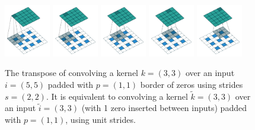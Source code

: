 \begin{figure}
	\includegraphics[width=0.18\textwidth]{figures/padding_strides_transposed_00}
	\includegraphics[width=0.18\textwidth]{figures/padding_strides_transposed_01}
	\includegraphics[width=0.18\textwidth]{figures/padding_strides_transposed_02}
	\includegraphics[width=0.18\textwidth]{figures/padding_strides_transposed_03}
	\includegraphics[width=0.18\textwidth]{figures/padding_strides_transposed_04}
	\caption{ The transpose of convolving a kernel $k=(3,3)$ over an input $i=(5,5)$ padded with $p=(1,1)$ border of zeros using strides $s=(2,2)$. It is equivalent to convolving a kernel $\tilde{k} = (3,3)$ over an input $\tilde{i} = (3,3)$ (with 1 zero inserted between inputs) padded with $p=(1,1)$, using unit strides.}
	\label{fig:conv_padding_strides_transposed}
\end{figure}

